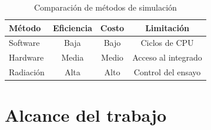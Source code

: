 \begin{table}[h]
	\centering
	\caption[Comparación de métodos de simulación]{Comparación de métodos de simulación\citep{ARTICLE:velazco}}
	\begin{tabular}{l c c c}    
		\toprule
        \textbf{Método} & \textbf{Eficiencia} & \textbf{Costo} & \textbf{Limitación}\\
		\midrule
        Software        & Baja                & Bajo           & Ciclos de CPU\\		
        Hardware        & Media               & Medio          & Acceso al integrado\\
        Radiación       & Alta                & Alto           & Control del ensayo\\
		\bottomrule
		\hline
	\end{tabular}
	\label{tab:arte}
\end{table}

\section{Alcance del trabajo}
\label{sec:alcance}
